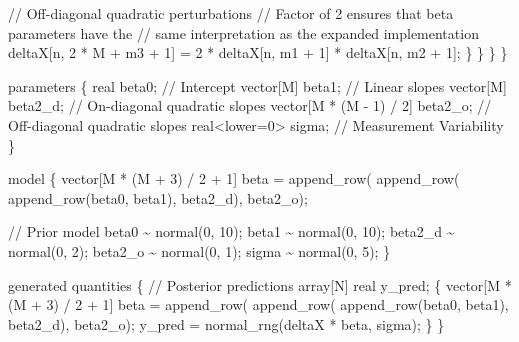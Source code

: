 \documentclass[
  letterpaper,
  DIV=11,
  numbers=noendperiod]{scrartcl}
\newenvironment{Shaded}{\begin{snugshade}}{\end{snugshade}}
\newcommand{\CommentTok}[1]{\textcolor[rgb]{0.37,0.37,0.37}{#1}}
\newcommand{\DataTypeTok}[1]{\textcolor[rgb]{0.68,0.00,0.00}{#1}}
\newcommand{\DecValTok}[1]{\textcolor[rgb]{0.68,0.00,0.00}{#1}}
\newcommand{\KeywordTok}[1]{\textcolor[rgb]{0.00,0.23,0.31}{#1}}
\newcommand{\NormalTok}[1]{\textcolor[rgb]{0.00,0.23,0.31}{#1}}
\begin{document}
\begin{codelisting}
\begin{Shaded}
\begin{Highlighting}[]
        \CommentTok{// Off{-}diagonal quadratic perturbations}
        \CommentTok{// Factor of 2 ensures that beta parameters have the}
        \CommentTok{// same interpretation as the expanded implementation}
\NormalTok{        deltaX[n, }\DecValTok{2}\NormalTok{ * M + m3 + }\DecValTok{1}\NormalTok{] }
\NormalTok{          = }\DecValTok{2}\NormalTok{ * deltaX[n, m1 + }\DecValTok{1}\NormalTok{] * deltaX[n, m2 + }\DecValTok{1}\NormalTok{];}
\NormalTok{      \}}
\NormalTok{    \}}
\NormalTok{  \}}
\NormalTok{\}}

\KeywordTok{parameters}\NormalTok{ \{}
  \DataTypeTok{real}\NormalTok{ beta0;                      }\CommentTok{// Intercept}
  \DataTypeTok{vector}\NormalTok{[M] beta1;                 }\CommentTok{// Linear slopes}
  \DataTypeTok{vector}\NormalTok{[M] beta2\_d;               }\CommentTok{// On{-}diagonal quadratic slopes}
  \DataTypeTok{vector}\NormalTok{[M * (M {-} }\DecValTok{1}\NormalTok{) / }\DecValTok{2}\NormalTok{] beta2\_o; }\CommentTok{// Off{-}diagonal quadratic slopes}
  \DataTypeTok{real}\NormalTok{\textless{}}\KeywordTok{lower}\NormalTok{=}\DecValTok{0}\NormalTok{\textgreater{} sigma;             }\CommentTok{// Measurement Variability}
\NormalTok{\}}

\KeywordTok{model}\NormalTok{ \{}
  \DataTypeTok{vector}\NormalTok{[M * (M + }\DecValTok{3}\NormalTok{) / }\DecValTok{2}\NormalTok{ + }\DecValTok{1}\NormalTok{] beta}
\NormalTok{    = append\_row(}
\NormalTok{        append\_row(}
\NormalTok{          append\_row(beta0, beta1), }
\NormalTok{        beta2\_d), }
\NormalTok{      beta2\_o);}
  
  \CommentTok{// Prior model}
\NormalTok{  beta0 \textasciitilde{} normal(}\DecValTok{0}\NormalTok{, }\DecValTok{10}\NormalTok{);}
\NormalTok{  beta1 \textasciitilde{} normal(}\DecValTok{0}\NormalTok{, }\DecValTok{10}\NormalTok{);}
\NormalTok{  beta2\_d \textasciitilde{} normal(}\DecValTok{0}\NormalTok{, }\DecValTok{2}\NormalTok{);}
\NormalTok{  beta2\_o \textasciitilde{} normal(}\DecValTok{0}\NormalTok{, }\DecValTok{1}\NormalTok{);}
\NormalTok{  sigma \textasciitilde{} normal(}\DecValTok{0}\NormalTok{, }\DecValTok{5}\NormalTok{);}
\NormalTok{\}}

\KeywordTok{generated quantities}\NormalTok{ \{}
  \CommentTok{// Posterior predictions}
  \DataTypeTok{array}\NormalTok{[N] }\DataTypeTok{real}\NormalTok{ y\_pred;}
\NormalTok{  \{}
    \DataTypeTok{vector}\NormalTok{[M * (M + }\DecValTok{3}\NormalTok{) / }\DecValTok{2}\NormalTok{ + }\DecValTok{1}\NormalTok{] beta}
\NormalTok{      = append\_row(}
\NormalTok{          append\_row(}
\NormalTok{            append\_row(beta0, beta1), }
\NormalTok{          beta2\_d),}
\NormalTok{        beta2\_o);}
\NormalTok{    y\_pred = normal\_rng(deltaX * beta, sigma);}
\NormalTok{  \}}
\NormalTok{\}}
\end{Highlighting}
\end{Shaded}

\end{codelisting}
\end{document}
